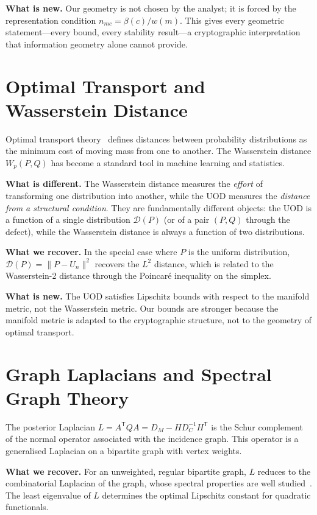 \textbf{What is new.}
Our geometry is not chosen by the analyst; it is forced by the
representation condition $n_{mc}=\beta(c)/w(m)$.  This gives every
geometric statement---every bound, every stability result---a
cryptographic interpretation that information geometry alone cannot
provide.

\section{Optimal Transport and Wasserstein Distance}\label{ch:sec:comparison-optimal-transport}

Optimal transport theory~\cite{villani2009optimal} defines distances
between probability distributions as the minimum cost of moving mass
from one to another.  The Wasserstein distance $W_p(P,Q)$ has become
a standard tool in machine learning and statistics.

\textbf{What is different.}
The Wasserstein distance measures the \emph{effort} of transforming
one distribution into another, while the UOD measures the
\emph{distance from a structural condition}.  They are fundamentally
different objects: the UOD is a function of a single distribution
$\mathcal D(P)$ (or of a pair $(P,Q)$ through the defect), while
the Wasserstein distance is always a function of two distributions.

\textbf{What we recover.}
In the special case where $P$ is the uniform distribution,
$\mathcal D(P)=\|P-U_n\|^2$ recovers the $L^2$ distance, which is
related to the Wasserstein-2 distance through the Poincar\'e
inequality on the simplex.

\textbf{What is new.}
The UOD satisfies Lipschitz bounds with respect to the manifold metric,
not the Wasserstein metric.  Our bounds are stronger because the
manifold metric is adapted to the cryptographic structure, not to the
geometry of optimal transport.

\section{Graph Laplacians and Spectral Graph Theory}\label{ch:sec:comparison-graph-laplacians}

The posterior Laplacian $L=A^{\mathsf T}QA=D_M-HD_C^{-1}H^{\mathsf T}$
is the Schur complement~\cite{zhang2005schur} of the normal operator associated with the
incidence graph.  This operator is a generalised Laplacian on a
bipartite graph with vertex weights.

\textbf{What we recover.}
For an unweighted, regular bipartite graph, $L$ reduces to the
combinatorial Laplacian of the graph, whose spectral properties are
well studied~\cite{chung1997spectral}.  The least eigenvalue of $L$
determines the optimal Lipschitz constant for quadratic functionals.

